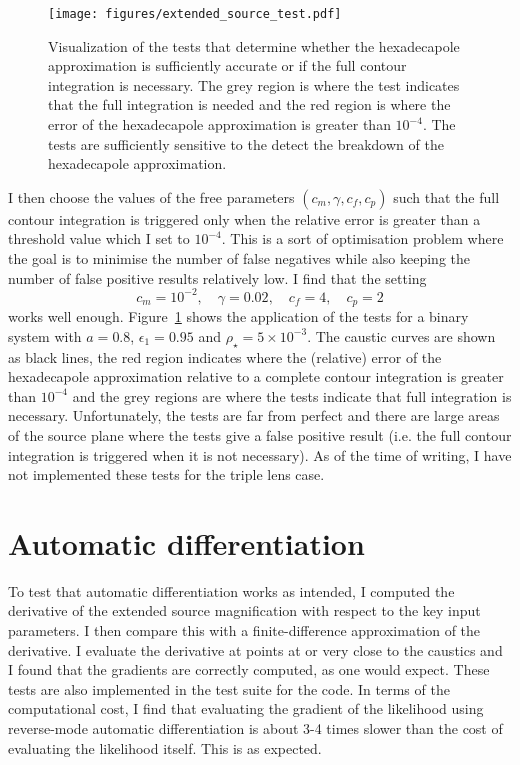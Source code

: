 \documentclass[12pt,dvipsnames]{report}
\begin{document}
\begin{figure}[t]
    \begin{centering}
        \texttt{[image: figures/extended\_source\_test.pdf]}
        \caption{
            Visualization of the tests that determine whether the 
            hexadecapole approximation is sufficiently accurate or if the full contour 
            integration is necessary. The grey region is where the test indicates 
            that the full integration is needed and the red region is where the 
            error of the hexadecapole approximation is greater than $10^{-4}$.
            The tests are sufficiently sensitive to the detect the breakdown of the 
            hexadecapole approximation.
            }
            \label{fig:extended_source_test}
    \end{centering}
\end{figure}

I then choose the values of the free parameters $(c_m, \gamma, c_f, c_p)$ such that the 
full contour integration is triggered only when the relative error is greater than a threshold 
value which I set to $10^{-4}$. This is a sort of optimisation problem where the goal is to minimise
the number of false negatives while also keeping the number of false positive results 
relatively low. I find that the setting 
\begin{equation}
    c_m=10^{-2},\quad \gamma=0.02,\quad c_f=4, \quad c_p=2
\end{equation}
works well enough. Figure~\ref{fig:extended_source_test} shows the application of the tests for a binary 
system with $a=0.8$, $\epsilon_1=0.95$ and $\rho_\star=5\times 10^{-3}$. The caustic 
curves are shown as black lines, the red region indicates where the (relative) error of 
the hexadecapole approximation relative to a complete contour integration is greater than 
$10^{-4}$ and the grey regions are where the tests indicate that full integration is 
necessary. Unfortunately, the tests are far from perfect and there are large areas of the 
source plane where the tests give a false positive result (i.e. the full contour integration
is triggered when it is not necessary). 
As of the time of writing, I have not implemented these tests for the triple lens case.

\section{Automatic differentiation}
\label{sec:caustics_autodiff}
To test that automatic differentiation works as intended, I computed the derivative 
of the extended source magnification with respect to the key input parameters. 
I then compare this with a finite-difference approximation of the derivative.
I evaluate the derivative at points at or very close to the caustics and I found 
that the gradients are correctly computed, as one would expect. These tests 
are also implemented in the test suite for the code. 
In terms of the computational cost, I find that evaluating the gradient of the likelihood
using reverse-mode automatic differentiation is about 3-4 times slower than the 
cost of evaluating the likelihood itself. This is as expected.
\end{document}
